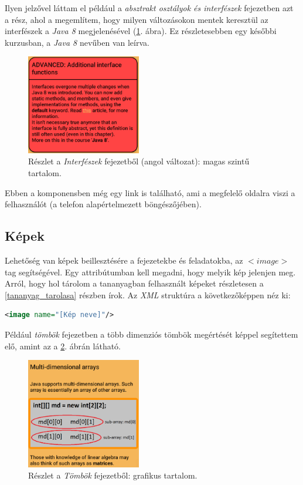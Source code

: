 \documentclass[12pt,a4paper]{article}
\newcommand{\xml}{\textit{XML}\xspace}
\begin{document}
	Ilyen jelzővel láttam el például a \textit{absztrakt osztályok és interfészek} fejezetben azt a rész, ahol a megemlítem, hogy milyen változásokon mentek keresztül az interfészek a \textit{Java 8} megjelenésével (\ref{advanced_component_figure}. ábra). Ez részletesebben egy későbbi kurzusban, a \textit{Java 8} nevűben van leírva.
	
	\begin{figure}[h!]
		\centering
		\includegraphics[width=5cm]{advanced_component}
		\caption{Részlet a \textit{Interfészek} fejezetből (angol változat): magas szintű tartalom.}
		\label{advanced_component_figure}
	\end{figure}
	
	Ebben a komponensben még egy link is található, ami a megfelelő oldalra viszi a felhasználót (a telefon alapértelmezett böngészőjében).
	
	\subsection{Képek}
	
	Lehetőség van képek beillesztésére a fejezetekbe és feladatokba, az $<image>$ tag segítségével. Egy attribútumban kell megadni, hogy melyik kép jelenjen meg. Arról, hogy hol tárolom a tananyagban felhasznált képeket részletesen a \ref{tananyag_tarolasa} részben írok. Az \xml struktúra a következőképpen néz ki:
	
	\bigskip
	\begin{lstlisting}[language=XML]
	<image name="[Kép neve]"/>
	\end{lstlisting}
	
	Például \textit{tömbök} fejezetben a több dimenziós tömbök megértését képpel segítettem elő, amint az a \ref{image_component_figure}. ábrán látható.
	
	\begin{figure}
		\centering
		\includegraphics[width=5cm]{image_component}
		\caption{Részlet a \textit{Tömbök} fejezetből: grafikus tartalom.}
		\label{image_component_figure}
	\end{figure}
	
\end{document}
